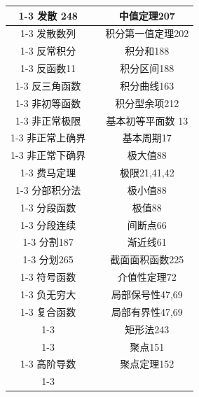 \begin{center}
{\begin{tabular}{|c|c|c|}
\cline{1-3}
发散 248 & \phantom{X} & 中值定理207 \\
\cline{1-3}
发散数列 & \phantom{X} & 积分第一值定理202 \\
\cline{1-3}
反常积分 & \phantom{X} & 积分和188 \\
\cline{1-3}
反函数11 & \phantom{X} & 积分区间188 \\
\cline{1-3}
反三角函数 & \phantom{X} & 积分曲线163 \\
\cline{1-3}
非初等函数 & \phantom{X} & 积分型余项212 \\
\cline{1-3}
非正常极限 & \phantom{X} & 基本初等平面数 13 \\
\cline{1-3}
非正常上确界 & \phantom{X} & 基本周期17 \\
\cline{1-3}
非正常下确界 & \phantom{X} & 极大值88 \\
\cline{1-3}
费马定理 & \phantom{X} & 极限21,41,42 \\
\cline{1-3}
分部积分法 & \phantom{X} & 极小值88 \\
\cline{1-3}
分段函数 & \phantom{X} & 极值88 \\
\cline{1-3}
分段连续 & \phantom{X} & 间断点66 \\
\cline{1-3}
分割187 & \phantom{X} & 渐近线61 \\
\cline{1-3}
分划265 & \phantom{X} & 截面面积函数225 \\
\cline{1-3}
符号函数 & \phantom{X} & 介值性定理72 \\
\cline{1-3}
负无穷大 & \phantom{X} & 局部保号性47,69 \\
\cline{1-3}
复合函数 & \phantom{X} & 局部有界性47,69 \\
\cline{1-3}
\phantom{X} & \phantom{X} & 矩形法243 \\
\cline{1-3}
\phantom{X} & \phantom{X} & 聚点151 \\
\cline{1-3}
高阶导数 & \phantom{X} & 聚点定理152 \\
\cline{1-3}
\hline
\end{tabular}
}
\end{center}

